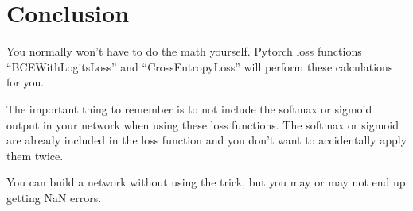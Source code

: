 \documentclass{article}
\begin{document}
\section{Conclusion}
You normally won't have to do the math yourself. Pytorch loss functions ``BCEWithLogitsLoss'' and ``CrossEntropyLoss'' will perform these calculations for you.

The important thing to remember is to not include the softmax or sigmoid output in your network when using these loss functions. The softmax or sigmoid are already included in the loss function and you don't want to accidentally apply them twice.

You can build a network without using the trick, but you may or may not end up getting NaN errors.
\end{document}

